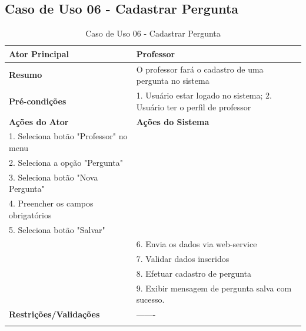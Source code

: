 \subsection{Caso de Uso 06 - Cadastrar Pergunta}
\label{sc:case6}
\begin{center}
\begin{longtable}{p{8cm}|p{8cm}}
    \hline
    \textbf{Ator Principal} & Professor \\
    \hline
    \textbf{Resumo} & O professor fará o cadastro de uma pergunta no sistema \\
    \hline
    \textbf{Pr\'{e}-condi\c{c}\~{o}es} & 1. Usuário estar logado no sistema; 2. Usuário ter o perfil de professor \\
    \hline
    \textbf{A\c{c}\~{o}es do Ator} & \textbf{A\c{c}\~{o}es do Sistema} \\
    \hline
    1. Seleciona botão "Professor" no menu & \\
    \hline
    2. Seleciona a opção "Pergunta" \\
    \hline
    3. Seleciona botão "Nova Pergunta" \\
    \hline
    4. Preencher os campos obrigatórios \\
    \hline
    5. Seleciona botão "Salvar" \\
    \hline
    & 6. Envia os dados via web-service \\
	\hline
	& 7. Validar dados inseridos \\
	\hline
	& 8. Efetuar cadastro de pergunta \\
	\hline
	& 9. Exibir mensagem de pergunta salva com sucesso. \\
    \hline
    \hline
    \textbf{Restri\c{c}\~{o}es/Valida\c{c}\~{o}es} & -------\\
\hline
\caption{Caso de Uso 06 - Cadastrar Pergunta}
\end{longtable}
\end{center}

